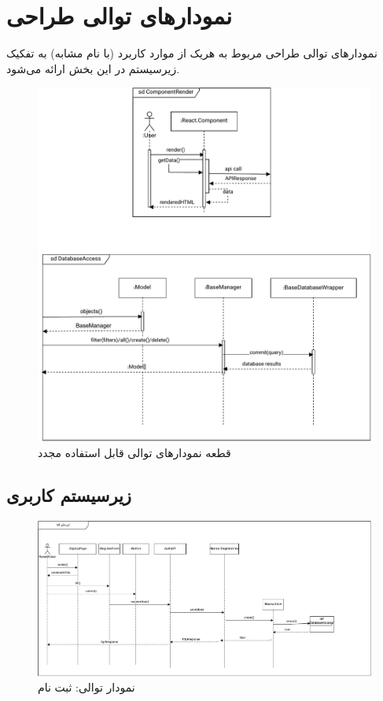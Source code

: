 \chapter{نمودارهای توالی طراحی}


نمودارهای توالی طراحی مربوط به هریک از موارد کاربرد (با نام مشابه) به تفکیک زیرسیستم در این بخش ارائه می‌شود.



\begin{figure}[ht!]
	\centering
	\includegraphics[scale=0.8]{figs/design-sequence/reusable.pdf}
	\caption{قطعه نمودارهای توالی قابل استفاده مجدد}
\end{figure}
\FloatBarrier
\newpage

\newpage
\section{زیرسیستم کاربری}

\eject \pdfpagewidth=12in \pdfpageheight=7in
\begin{figure}[ht!]
	\centering
	\includegraphics[scale=0.8]{figs/design-sequence/3-1.pdf}
	\caption{نمودار توالی: ثبت نام}
\end{figure}
\FloatBarrier
\newpage

